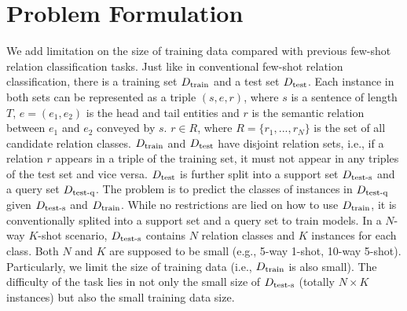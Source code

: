 \section{Problem Formulation}
We add limitation on the size of training data compared with previous few-shot relation classification tasks.
Just like in conventional few-shot relation classification, there is a training set
$D_{\rm{train}}$ and a test set $D_{\rm{test}}$.
Each instance in both sets can be represented as a triple $(s,e,r)$,
where $s$ is a sentence of length $T$, $e=(e_1, e_2)$ is the head and tail entities and
$r$ is the semantic relation between $e_1$ and $e_2$ conveyed by $s$.
$r \in R$, where $R=\{r_1,...,r_N\}$ is the set of all candidate relation classes.
$D_{\rm{train}}$ and $D_{\rm{test}}$ have disjoint relation sets, i.e.,
if a relation $r$ appears in a triple of the training set, it must not appear
in any triples of the test set and vice versa.
$D_{\rm{test}}$ is further split into a support set $D_{\rm{test\text{-}s}}$
and a query set $D_{\rm{test\text{-}q}}$. The problem is to predict
the classes of instances in $D_{\rm{test\text{-}q}}$ given
$D_{\rm{test\text{-}s}}$ and $D_{\rm{train}}$. While no restrictions are lied on how to use $D_{\rm{train}}$, it is conventionally splited into a support set and a query set to train models.
In a $N$-way $K$-shot %
scenario,
$D_{\rm{test\text{-}s}}$ contains $N$ relation classes and $K$ instances
for each class. Both $N$ and $K$ are supposed to be small (e.g., 5-way 1-shot, 10-way 5-shot).
Particularly, we limit the size of training data (i.e.,  $D_{\rm{train}}$ is also small).
The difficulty of 
the task lies in not only the small size of
$D_{\rm{test\text{-}s}}$ (totally $N\times K$ instances) but also the small training data size.

